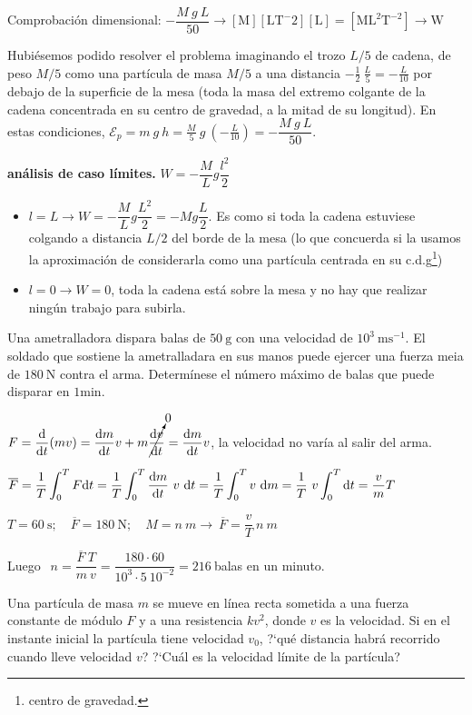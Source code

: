 \textcolor{gris}{Comprobación dimensional: $-\dfrac{M\ g\ L }{50} \to 
[\mathrm{M}][\mathrm{LT}^-{2}][\mathrm{L}]=[\mathrm{ML}^2\mathrm{T}^{-2}]\to \mathrm{W}$}


\textcolor{gris}{\textsf{Hubiésemos podido resolver el problema imaginando el trozo $L/5$ de cadena, de peso $M/5$ como una partícula de masa $M/5$ a una distancia $-\frac 1 2 \ \frac L 5=-\frac {L}{10}$ por debajo de la superficie de la mesa (toda la masa del extremo colgante de la cadena concentrada en su centro de gravedad, a la mitad de su longitud). En estas condiciones, $\mathcal E_p=m \ g \ h=\frac M 5 \ g \ \left( -\frac L {10} \right) = -\dfrac{M\ g\ L }{50}$.}}

\textbf{análisis de caso límites.} $W=-\dfrac M L g \dfrac {l^2}2$
\begin{itemize}
\item $l=L \to W=-\dfrac M L g \dfrac {L^2}2=-Mg\dfrac L 2$. Es como si toda la cadena estuviese colgando a distancia $L/2$ del borde de la mesa (lo que concuerda si la usamos la aproximación de considerarla como una partícula centrada en su c.d.g\footnote{centro de gravedad.})
\item $l=0 \to W=0$, toda la cadena está sobre la mesa y no hay que realizar ningún trabajo para subirla.
\end{itemize}


\begin{prob}
Una ametralladora dispara balas de $50\ \mathrm{g}$ con una velocidad de $10^3\ \mathrm{ms}^{-1}$. El soldado que sostiene la ametralladara en sus manos puede ejercer una fuerza meia de $180\ \mathrm{N}$ contra el arma. Determínese el número máximo de balas que puede disparar en $1 \mathrm{min}$.	
\end{prob}

$F=\displaystyle \dv{t} (mv)=\dv{m}{t} v + m \cancelto{0}{\dv{v}{t}}=\dv{m}{t} v$, la velocidad no varía al salir del  arma.

$\overline{F} \displaystyle =\dfrac 1 T \int_0^T F \dd t=\dfrac 1 T \int_0^T \dv{m}{t} \ v\  \dd t=\dfrac 1 T \int_0^T v\  \dd m= \dfrac 1 T\  v \int_0^T \dd t = \dfrac v m T$

$T=60 \ \mathrm{s}; \quad \overline{F}=180\ \mathrm{N}; \quad M=n\ m \to \ \overline{F}=\dfrac v T \ n \ m$

Luego $\ \ n=\dfrac {\overline{F} \ T}{m \ v}= \dfrac{180 \cdot 60}{10^3 \cdot 5\ 10^{-2}}=216\ $balas en un minuto.


\begin{prob}
Una partícula de masa $m$ se mueve	en línea recta sometida a una fuerza constante de módulo $F$ y a una resistencia $kv^2$, donde $v$ es la velocidad. Si en el instante inicial la partícula tiene velocidad $v_0$, ?`qué distancia habrá recorrido cuando lleve velocidad $v$? ?`Cuál es la velocidad límite de la partícula? 
\end{prob}

